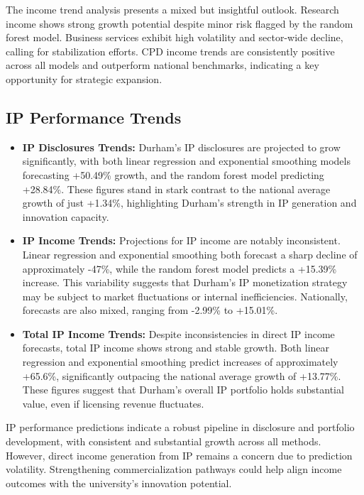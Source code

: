 \documentclass[journal,onecolumn, 10pt,draftclsnofoot]{IEEEtran}
\begin{document}
The income trend analysis presents a mixed but insightful outlook. Research income shows strong growth potential despite minor risk flagged by the random forest model. Business services exhibit high volatility and sector-wide decline, calling for stabilization efforts. CPD income trends are consistently positive across all models and outperform national benchmarks, indicating a key opportunity for strategic expansion.

\subsection{IP Performance Trends}

\begin{itemize}
    \item \textbf{IP Disclosures Trends:} Durham's IP disclosures are projected to grow significantly, with both linear regression and exponential smoothing models forecasting +50.49\% growth, and the random forest model predicting +28.84\%. These figures stand in stark contrast to the national average growth of just +1.34\%, highlighting Durham's strength in IP generation and innovation capacity.
    
    \item \textbf{IP Income Trends:} Projections for IP income are notably inconsistent. Linear regression and exponential smoothing both forecast a sharp decline of approximately -47\%, while the random forest model predicts a +15.39\% increase. This variability suggests that Durham's IP monetization strategy may be subject to market fluctuations or internal inefficiencies. Nationally, forecasts are also mixed, ranging from -2.99\% to +15.01\%.
    
    \item \textbf{Total IP Income Trends:} Despite inconsistencies in direct IP income forecasts, total IP income shows strong and stable growth. Both linear regression and exponential smoothing predict increases of approximately +65.6\%, significantly outpacing the national average growth of +13.77\%. These figures suggest that Durham's overall IP portfolio holds substantial value, even if licensing revenue fluctuates.
\end{itemize}

IP performance predictions indicate a robust pipeline in disclosure and portfolio development, with consistent and substantial growth across all methods. However, direct income generation from IP remains a concern due to prediction volatility. Strengthening commercialization pathways could help align income outcomes with the university's innovation potential.
\end{document}
